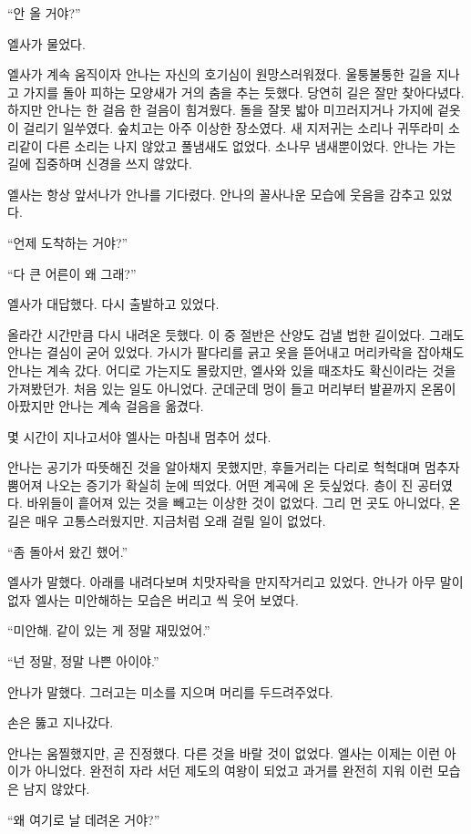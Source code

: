 ``안 올 거야?''

엘사가 물었다.

엘사가 계속 움직이자 안나는 자신의 호기심이 원망스러워졌다. 울퉁불퉁한 길을 지나고 가지를 돌아 피하는 모양새가 거의 춤을 추는 듯했다. 당연히 길은 잘만 찾아다녔다. 하지만 안나는 한 걸음 한 걸음이 힘겨웠다. 돌을 잘못 밟아 미끄러지거나 가지에 겉옷이 걸리기 일쑤였다. 숲치고는 아주 이상한 장소였다. 새 지저귀는 소리나 귀뚜라미 소리같이 다른 소리는 나지 않았고 풀냄새도 없었다. 소나무 냄새뿐이었다. 안나는 가는 길에 집중하며 신경을 쓰지 않았다.

엘사는 항상 앞서나가 안나를 기다렸다. 안나의 꼴사나운 모습에 웃음을 감추고 있었다.

``언제 도착하는 거야?''

``다 큰 어른이 왜 그래?''

엘사가 대답했다. 다시 출발하고 있었다.

올라간 시간만큼 다시 내려온 듯했다. 이 중 절반은 산양도 겁낼 법한 길이었다. 그래도 안나는 결심이 굳어 있었다. 가시가 팔다리를 긁고 옷을 뜯어내고 머리카락을 잡아채도 안나는 계속 갔다. 어디로 가는지도 몰랐지만, 엘사와 있을 때조차도 확신이라는 것을 가져봤던가. 처음 있는 일도 아니었다. 군데군데 멍이 들고 머리부터 발끝까지 온몸이 아팠지만 안나는 계속 걸음을 옮겼다.

몇 시간이 지나고서야 엘사는 마침내 멈추어 섰다.

안나는 공기가 따뜻해진 것을 알아채지 못했지만, 후들거리는 다리로 헉헉대며 멈추자 뿜어져 나오는 증기가 확실히 눈에 띄었다. 어떤 계곡에 온 듯싶었다. 층이 진 공터였다. 바위들이 흩어져 있는 것을 빼고는 이상한 것이 없었다. 그리 먼 곳도 아니었다, 온 길은 매우 고통스러웠지만. 지금처럼 오래 걸릴 일이 없었다.

``좀 돌아서 왔긴 했어.''

엘사가 말했다. 아래를 내려다보며 치맛자락을 만지작거리고 있었다. 안나가 아무 말이 없자 엘사는 미안해하는 모습은 버리고 씩 웃어 보였다.

``미안해. 같이 있는 게 정말 재밌었어.''

``넌 정말, 정말 나쁜 아이야.''

안나가 말했다. 그러고는 미소를 지으며 머리를 두드려주었다.

손은 뚫고 지나갔다.

안나는 움찔했지만, 곧 진정했다. 다른 것을 바랄 것이 없었다. 엘사는 이제는 이런 아이가 아니었다. 완전히 자라 서던 제도의 여왕이 되었고 과거를 완전히 지워 이런 모습은 남지 않았다.

``왜 여기로 날 데려온 거야?''

